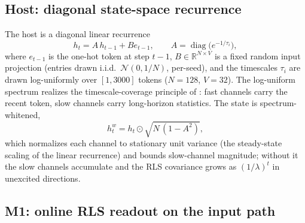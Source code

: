 \documentclass[preprint,12pt]{elsarticle}
\begin{document}
\subsection{Host: diagonal state-space recurrence}
\label{sec:host}

The host is a diagonal linear recurrence
\begin{equation}
h_t = A\, h_{t-1} + B e_{t-1}, \qquad
A = \operatorname{diag}\big(e^{-1/\tau_i}\big),
\label{eq:recur}
\end{equation}
where $e_{t-1}$ is the one-hot token at step $t-1$, $B \in
\mathbb{R}^{N \times V}$ is a fixed random input projection
(entries drawn i.i.d.\ $\mathcal{N}(0, 1/N)$, per-seed), and the
timescales $\tau_i$ are drawn log-uniformly over $[1, 3000]$ tokens
($N = 128$, $V = 32$). The log-uniform spectrum realizes the
timescale-coverage principle of \cite{redemc}: fast channels carry the
recent token, slow channels carry long-horizon statistics. The state is
spectrum-whitened,
\begin{equation}
h^w_t = h_t \odot \sqrt{N\,(1 - A^2)},
\label{eq:whiten}
\end{equation}
which normalizes each channel to stationary unit variance (the
steady-state scaling of the linear recurrence) and bounds slow-channel
magnitude; without it the slow channels accumulate and the RLS
covariance grows as $(1/\lambda)^t$ in unexcited directions.

\subsection{M1: online RLS readout on the input path}
\label{sec:m1}
\end{document}
